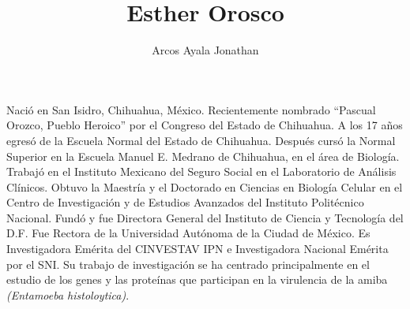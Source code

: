 \documentclass[a4paper,12pt]{article}
\title{Esther Orosco}
\author{Arcos Ayala Jonathan}
\begin{document}
\maketitle
Naci\'o en San Isidro, Chihuahua, M\'exico. Recientemente nombrado \textquotedblleft Pascual Orozco, Pueblo Heroico\textquotedblright
por el Congreso del Estado de Chihuahua. A los 17 años egres\'o de la Escuela Normal del Estado de Chihuahua. Despu\'es cursó la Normal
Superior en la Escuela Manuel E. Medrano de Chihuahua, en el área de Biolog\'ia. Trabajó en el Instituto Mexicano del Seguro Social en el
Laboratorio de An\'alisis Cl\'inicos. Obtuvo la Maestr\'ia y el Doctorado en Ciencias en Biolog\'ia Celular en el Centro de Investigaci\'on
y de Estudios Avanzados del Instituto Polit\'ecnico Nacional. Fund\'o y fue Directora General del Instituto de Ciencia y Tecnolog\'ia del
D.F. Fue Rectora de la Universidad Aut\'onoma de la Ciudad de M\'exico. Es Investigadora Em\'erita del CINVESTAV IPN e Investigadora Nacional
Em\'erita por el SNI. Su trabajo de investigaci\'on se ha centrado principalmente en el estudio de los genes y las prote\'inas que participan
en la virulencia de la amiba {\itshape(Entamoeba histoloytica)}.
\end{document}
